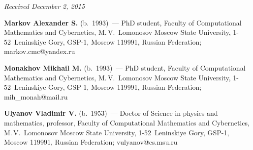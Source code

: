 \vspace*{-3pt}

\hfill{\small\textit{Received December 2, 2015}}



\Contr

\noindent
\textbf{Markov Alexander S.} (b.\ 1993)~--- 
PhD student, Faculty of Computational Mathematics and Cybernetics,  
M.\,V.~Lomonosov Moscow State University, 1-52~Leninskiye Gory, GSP-1, Moscow 119991, 
Russian Federation; \mbox{markov.cmc@yandex.ru}

\vspace*{3pt}

\noindent
\textbf{Monakhov Mikhail M.} (b.\ 1993)~---
PhD student, Faculty of Computational Mathematics and Cybernetics,  
M.\,V.~Lomonosov Moscow State University, 1-52~Leninskiye Gory, GSP-1, Moscow 119991, 
Russian Federation; \mbox{mih\_monah@mail.ru}

\vspace*{3pt}

\noindent
\textbf{Ulyanov Vladimir V.} (b.\ 1953)~---
Doctor of Science in physics and mathematics, professor, Faculty 
of Computational Mathematics and Cybernetics,  M.\,V.~Lomonosov Moscow State University, 
1-52~Leninskiye Gory, GSP-1, Moscow 119991, Russian Federation; 
\mbox{vulyanov@cs.msu.ru}

\label{end\stat}


\renewcommand{\bibname}{\protect\rm Литература}
